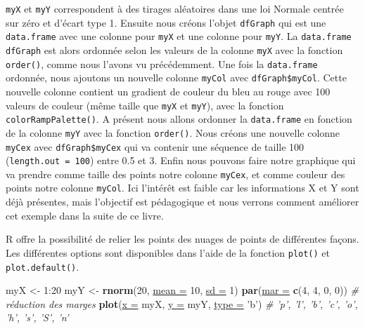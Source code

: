 \documentclass[twoside,symmetric]{book}
\newenvironment{Shaded}{}{}
\newcommand{\CommentTok}[1]{\textit{#1}}
\newcommand{\DataTypeTok}[1]{\underline{#1}}
\newcommand{\DecValTok}[1]{#1}
\newcommand{\KeywordTok}[1]{\textbf{#1}}
\newcommand{\NormalTok}[1]{#1}
\newcommand{\OperatorTok}[1]{#1}
\newcommand{\StringTok}[1]{#1}
\begin{document}
\texttt{myX} et \texttt{myY} correspondent à des tirages aléatoires dans une loi Normale centrée sur zéro et d'écart type 1. Ensuite nous créons l'objet \texttt{dfGraph} qui est une \texttt{data.frame} avec une colonne pour \texttt{myX} et une colonne pour \texttt{myY}. La \texttt{data.frame} \texttt{dfGraph} est alors ordonnée selon les valeurs de la colonne \texttt{myX} avec la fonction \texttt{order()}, comme nous l'avons vu précédemment. Une fois la \texttt{data.frame} ordonnée, nous ajoutons un nouvelle colonne \texttt{myCol} avec \texttt{dfGraph\$myCol}. Cette nouvelle colonne contient un gradient de couleur du bleu au rouge avec 100 valeurs de couleur (même taille que \texttt{myX} et \texttt{myY}), avec la fonction \texttt{colorRampPalette()}. A présent nous allons ordonner la \texttt{data.frame} en fonction de la colonne \texttt{myY} avec la fonction \texttt{order()}. Nous créons une nouvelle colonne \texttt{myCex} avec \texttt{dfGraph\$myCex} qui va contenir une séquence de taille 100 (\texttt{length.out\ =\ 100}) entre 0.5 et 3. Enfin nous pouvons faire notre graphique qui va prendre comme taille des points notre colonne \texttt{myCex}, et comme couleur des points notre colonne \texttt{myCol}. Ici l'intérêt est faible car les informations X et Y sont déjà présentes, mais l'objectif est pédagogique et nous verrons comment améliorer cet exemple dans la suite de ce livre.

R offre la possibilité de relier les points des nuages de points de différentes façons. Les différentes options sont disponibles dans l'aide de la fonction \texttt{plot()} et \texttt{plot.default()}.

\begin{Shaded}
\begin{Highlighting}[]
\NormalTok{myX <-}\StringTok{ }\DecValTok{1}\OperatorTok{:}\DecValTok{20}
\NormalTok{myY <-}\StringTok{ }\KeywordTok{rnorm}\NormalTok{(}\DecValTok{20}\NormalTok{, }\DataTypeTok{mean =} \DecValTok{10}\NormalTok{, }\DataTypeTok{sd =} \DecValTok{1}\NormalTok{)}
\KeywordTok{par}\NormalTok{(}\DataTypeTok{mar =} \KeywordTok{c}\NormalTok{(}\DecValTok{4}\NormalTok{, }\DecValTok{4}\NormalTok{, }\DecValTok{0}\NormalTok{, }\DecValTok{0}\NormalTok{)) }\CommentTok{# réduction des marges}
\KeywordTok{plot}\NormalTok{(}\DataTypeTok{x =}\NormalTok{ myX, }\DataTypeTok{y =}\NormalTok{ myY, }
  \DataTypeTok{type =} \StringTok{'b'}\NormalTok{) }\CommentTok{# 'p', 'l', 'b', 'c', 'o', 'h', 's', 'S', 'n'}
\end{Highlighting}
\end{Shaded}
\end{document}
